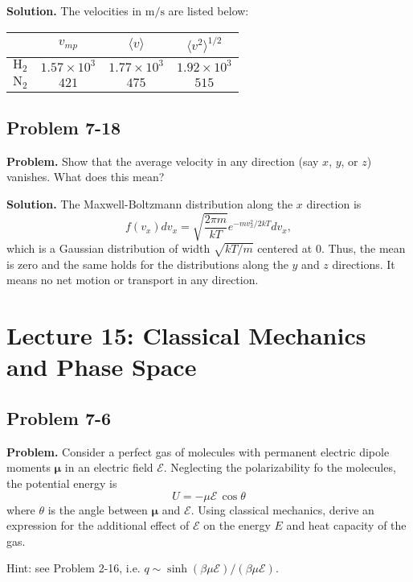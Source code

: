 \documentclass[twocolumn, 10pt]{article}
\numberwithin{equation}{section}
\newenvironment{problem}
{\par\medskip\sffamily \color{problue}
  \textbf{Problem. }\ignorespaces}
{\medskip}
\newenvironment{solution}
{\par\medskip
  \textbf{Solution. }\ignorespaces}
{\medskip}
\begin{document}
\begin{solution}
The velocities in $\mathrm{m/s}$ are listed below:
\begin{table}[h]
\begin{tabular}{c | c c c}
  \hline \hline
  & $v_{mp}$  & $\langle v \rangle$ & $\langle v^2 \rangle^{1/2}$\\
  \hline
  $\mathrm H_2$ &
  $1.57\times10^3$ &
  $1.77\times10^3$ &
  $1.92\times10^3$\\
  $\mathrm N_2$ &
  $421$ &
  $475$ &
  $515$ \\
  \hline \hline
\end{tabular}
\end{table}
\end{solution}

\subsection{Problem 7-18}

\begin{problem}
  Show that the average velocity in any direction
  (say $x$, $y$, or $z$) vanishes.
  What does this mean?
\end{problem}

\begin{solution}
  [Due to Dr. Pettitt.]
  The Maxwell-Boltzmann distribution along the $x$ direction is
  $$
  f(v_x) d v_x = \sqrt{\frac{2\pi m }{kT}} e^{-m v_x^2/2kT} d v_x,
  $$
  which is a Gaussian distribution of width $\sqrt{kT/m}$
  centered at $0$.
  Thus, the mean is zero
  and the same holds for the distributions
  along the $y$ and $z$ directions.
  It means no net motion or transport in any direction.
\end{solution}

\section{Lecture 15: Classical Mechanics and Phase Space}

\subsection{Problem 7-6}

\begin{problem}
  Consider a perfect gas of molecules
  with permanent electric dipole moments $\pmb\mu$
  in an electric field $\mathscr E$.
  Neglecting the polarizability fo the molecules,
  the potential energy is
  $$
  U = -\mu \mathscr E \, \cos\theta
  $$
  where $\theta$ is the angle between $\pmb\mu$
  and $\mathscr E$.
  Using classical mechanics,
  derive an expression for the additional effect of $\mathscr E$
  on the energy $E$ and heat capacity of the gas.

  Hint: see Problem 2-16, i.e.
  $q \sim \sinh(\beta \mu \mathscr E)/(\beta \mu \mathscr E)$.
\end{problem}
\end{document}

